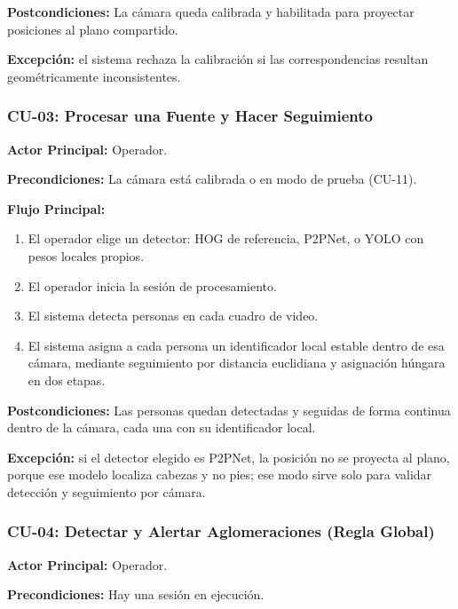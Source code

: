 \textbf{Postcondiciones:} La cámara queda calibrada y habilitada para proyectar posiciones
al plano compartido.

\textbf{Excepción:} el sistema rechaza la calibración si las correspondencias resultan
geométricamente inconsistentes.


\subsubsection{CU-03: Procesar una Fuente y Hacer Seguimiento}
\textbf{Actor Principal:} Operador.

\textbf{Precondiciones:} La cámara está calibrada o en modo de prueba (CU-11).

\textbf{Flujo Principal:}
\begin{enumerate}
  \item El operador elige un detector: HOG de referencia, P2PNet, o YOLO con pesos locales
  propios.
  \item El operador inicia la sesión de procesamiento.
  \item El sistema detecta personas en cada cuadro de video.
  \item El sistema asigna a cada persona un identificador local estable dentro de esa cámara,
  mediante seguimiento por distancia euclidiana y asignación húngara en dos etapas.
\end{enumerate}

\textbf{Postcondiciones:} Las personas quedan detectadas y seguidas de forma continua
dentro de la cámara, cada una con su identificador local.

\textbf{Excepción:} si el detector elegido es P2PNet, la posición no se proyecta al plano,
porque ese modelo localiza cabezas y no pies; ese modo sirve solo para validar detección y
seguimiento por cámara.


\subsubsection{CU-04: Detectar y Alertar Aglomeraciones (Regla Global)}
\textbf{Actor Principal:} Operador.

\textbf{Precondiciones:} Hay una sesión en ejecución.

